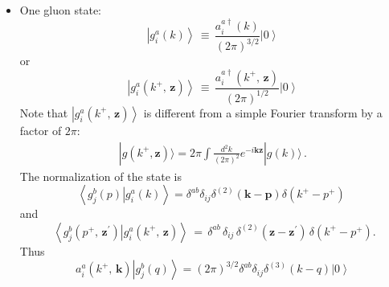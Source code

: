 \documentclass[aps,prd,amsmath,amssymb,nofootinbib]{revtex4-2}
\def\v#1{\mathbf{#1}}
\numberwithin{equation}{section}
\begin{document}
\begin{itemize}
  \item One gluon state:  
    \begin{equation}
      \label{gsta}
  \left|g_{i}^{a}(k)\right\rangle \,\equiv\,\frac{a_{i}^{a\dagger}(k)}{(2\pi)^{3/2}}\left|0\right\rangle 
\end{equation}
or 
\begin{equation}
  \label{gstax}
\left|g_{i}^{a}(k^{+},\, \mathbf{z})\right\rangle \,\equiv\,\frac{a_{i}^{a\dagger}(k^{+},\, \mathbf{z})}{(2\pi)^{1/2}}\left|0\right\rangle 
\end{equation}
Note that $\left|g_{i}^{a}(k^{+},\, \mathbf{z})\right\rangle$ is different from a simple Fourier transform by a factor of $2\pi$: 
\begin{align}
    |g(k^+,\v z) \rangle  = 2\pi \int \frac{d^2k}{(2\pi)^2}  e^{-i \v k \v z }   |g(k) \rangle\,.
\end{align}
The normalization of the state is 
$$
\left\langle g_{j}^{b}(p)\left|g_{i}^{a}(k)\right.\right\rangle
=\delta^{ab}\delta_{ij}\delta^{(2)}(\mathbf{k}-\mathbf{p})\delta(k^{+}-p^{+})\;$$ 
and 
$$\;
\left\langle g_{j}^{b}(p^{+},\,\mathbf{z}^{\prime})\left|g_{i}^{a}(k^{+},\,\mathbf{z})\right.\right\rangle 
\,=\,\delta^{ab}\,\delta_{ij}\,\delta^{(2)}(\mathbf{z}-\mathbf{z}^{\prime})\,\delta(k^{+}-p^{+}).
$$
Thus 
\begin{equation}
 a_{i}^{a}(k^{+},\, \mathbf{k})\left|g^b_j(q)\right\rangle = (2\pi )^{3/2}\delta^{ab} \delta_{ij}\delta^{(3)}(k-q)  \left| 0 \right\rangle
\end{equation}





\end{itemize}
\end{document}
